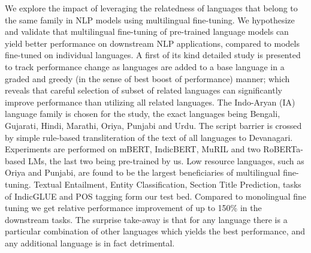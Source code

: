 We explore the impact of leveraging the relatedness of languages that belong to the same family in NLP models using multilingual fine-tuning. We hypothesize and validate that multilingual fine-tuning of pre-trained language models can yield better performance on downstream NLP applications, compared to models fine-tuned on individual languages. A first of its kind detailed study is presented to track performance change as languages are added to a base language in a graded and greedy (in the sense of best boost of performance) manner; which reveals that careful selection of subset of related languages can significantly improve performance than utilizing all related languages. The Indo-Aryan (IA) language family is chosen for the study, the exact languages being Bengali, Gujarati, Hindi, Marathi, Oriya, Punjabi and Urdu. The script barrier is crossed by simple rule-based transliteration of the text of all languages to Devanagari. Experiments are performed on mBERT, IndicBERT, MuRIL and two  RoBERTa-based LMs, the last two being pre-trained by us.  Low resource languages, such as Oriya and Punjabi, are found to be the largest beneficiaries of multilingual fine-tuning. Textual Entailment, Entity Classification, Section Title Prediction, tasks of IndicGLUE and POS tagging form our test bed. Compared to monolingual fine tuning we get relative performance improvement of up to 150\% in the downstream tasks. The surprise take-away is that for any language there is a particular combination of other languages which yields the best performance, and any additional language is in fact detrimental.
